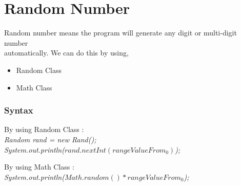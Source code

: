\documentclass[openany]{book}  %
\begin{document}
\section{Random Number}
Random number means the program will generate any digit or multi-digit number \\
automatically. We can do this by using,
\begin{itemize}
    \item Random Class
    \item Math Class
\end{itemize}
% 
% 
\subsubsection{Syntax}
\begin{center}
    \tt{
        \raggedright{By using Random Class : }\\
        \textit{
            Random rand = new Rand();\\
            System.out.println($rand.nextInt(rangeValueFrom_0)$);\\
        }
        \vskip 0.5cm
        \raggedright{By using Math Class : }\\
        \textit{
            System.out.println($Math.random()*rangeValueFrom_0$);\\
        }
    }
\end{center}

\newpage

% 
% 
\end{document}
